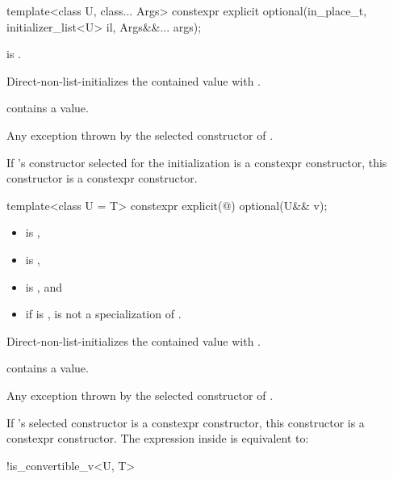 %
\begin{itemdecl}
template<class U, class... Args>
  constexpr explicit optional(in_place_t, initializer_list<U> il, Args&&... args);
\end{itemdecl}

\begin{itemdescr}
\pnum
\constraints
{} is .

\pnum
\effects
Direct-non-list-initializes the contained value with .

\pnum
\ensures
{} contains a value.

\pnum
\throws
Any exception thrown by the selected constructor of .

\pnum
\remarks
If 's constructor selected for the initialization is a constexpr constructor, this constructor is a constexpr constructor.
\end{itemdescr}

%
\begin{itemdecl}
template<class U = T> constexpr explicit(@\seebelow@) optional(U&& v);
\end{itemdecl}

\begin{itemdescr}
\pnum
\constraints
\begin{itemize}
\item {} is ,
\item {} is ,
\item {} is , and
\item if  is \cv{} ,
 is not a specialization of .
\end{itemize}

\pnum
\effects
Direct-non-list-initializes the contained value with .

\pnum
\ensures
{} contains a value.

\pnum
\throws
Any exception thrown by the selected constructor of .

\pnum
\remarks
If 's selected constructor is a constexpr constructor,
this constructor is a constexpr constructor.
The expression inside  is equivalent to:
\begin{codeblock}
!is_convertible_v<U, T>
\end{codeblock}
\end{itemdescr}

